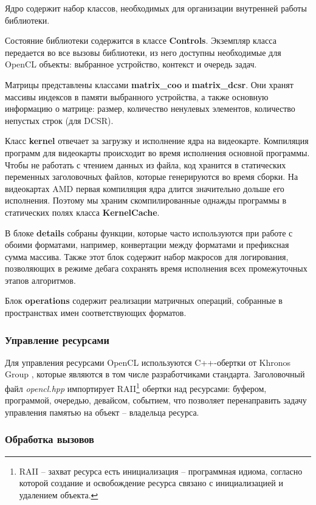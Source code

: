 \documentclass[14pt]{extarticle}
\newcommand{\bld}{\textbf}
\begin{document}
	
	Ядро содержит набор классов, необходимых для организации внутренней работы библиотеки.

	Состояние библиотеки содержится в классе \textbf{Controls}. Экземпляр класса передается во все вызовы библиотеки, из него доступны необходимые для OpenCL объекты: выбранное устройство, контекст и очередь задач. 
	  
	Матрицы представлены классами \textbf{matrix\_coo} и \textbf{matrix\_dcsr}. Они хранят массивы индексов в памяти выбранного устройства, а также основную информацию о матрице: размер, количество ненулевых элементов, количество непустых строк (для DCSR).
	
	Класс \textbf{kernel} отвечает за загрузку и исполнение ядра на видеокарте. Компиляция программ для видеокарты происходит во время исполнения основной программы. Чтобы не работать с чтением данных из файла, код хранится в статических переменных заголовочных файлов, которые генерируются во время сборки. На видеокартах AMD первая компиляция ядра длится значительно дольше его исполнения. Поэтому мы храним скомпилированные однажды программы в статических полях класса \bld{KernelCache}.
	
	В блоке \bld{details} собраны функции, которые часто используются при работе с обоими форматами, например, конвертации между форматами и префиксная сумма массива. Также этот блок содержит набор макросов для логирования, позволяющих в режиме дебага сохранять время исполнения всех промежуточных этапов алгоритмов. 
	
	Блок \bld{operations} содержит реализации матричных операций, собранные в пространствах имен соответствующих форматов.
	
	\subsubsection*{Управление ресурсами}
	
	Для управления ресурсами OpenCL используются C++-обертки от Khronos Group \cite{khronos_wrap}, которые являются в том числе разработчиками стандарта. Заголовочный файл \emph{opencl.hpp} импортирует RAII\footnote{RAII -- захват ресурса есть инициализация -- программная идиома, согласно которой создание и освобождение ресурса связано с инициализацией и удалением объекта.} обертки над ресурсами: буфером, программой, очередью, девайсом, событием, что позволяет перенаправить задачу управления памятью на объект -- владельца ресурса. 
	
	\subsubsection*{Обработка вызовов}
	
\end{document}
